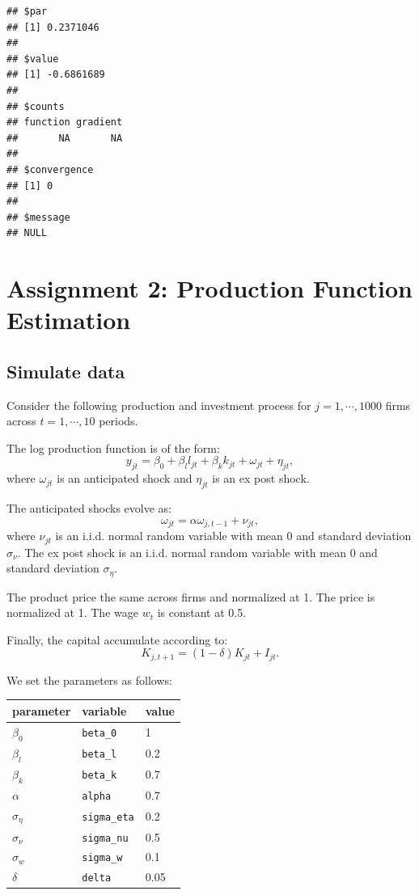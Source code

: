 \documentclass[
]{book}
\begin{document}
\begin{verbatim}
## $par
## [1] 0.2371046
## 
## $value
## [1] -0.6861689
## 
## $counts
## function gradient 
##       NA       NA 
## 
## $convergence
## [1] 0
## 
## $message
## NULL
\end{verbatim}

\hypertarget{assignment2}{%
\chapter{Assignment 2: Production Function Estimation}\label{assignment2}}

\hypertarget{simulate-data-1}{%
\section{Simulate data}\label{simulate-data-1}}

Consider the following production and investment process for \(j = 1, \cdots, 1000\) firms across \(t = 1, \cdots, 10\) periods.

The log production function is of the form:
\[
y_{jt} = \beta_0 + \beta_l l_{jt} + \beta_k k_{jt} + \omega_{jt} + \eta_{jt},
\]
where \(\omega_{jt}\) is an anticipated shock and \(\eta_{jt}\) is an ex post shock.

The anticipated shocks evolve as:
\[
\omega_{jt} = \alpha \omega_{j, t - 1} + \nu_{jt},
\]
where \(\nu_{jt}\) is an i.i.d. normal random variable with mean 0 and standard deviation \(\sigma_\nu\). The ex post shock is an i.i.d. normal random variable with mean 0 and standard deviation \(\sigma_{\eta}\).

The product price the same across firms and normalized at 1. The price is normalized at 1. The wage \(w_t\) is constant at 0.5.

Finally, the capital accumulate according to:
\[
K_{j, t + 1} = (1 - \delta) K_{jt} + I_{jt}.
\]

We set the parameters as follows:

\begin{longtable}[]{@{}lll@{}}
\toprule()
parameter & variable & value \\
\midrule()
\endhead
\(\beta_0\) & \texttt{beta\_0} & 1 \\
\(\beta_l\) & \texttt{beta\_l} & 0.2 \\
\(\beta_k\) & \texttt{beta\_k} & 0.7 \\
\(\alpha\) & \texttt{alpha} & 0.7 \\
\(\sigma_{\eta}\) & \texttt{sigma\_eta} & 0.2 \\
\(\sigma_{\nu}\) & \texttt{sigma\_nu} & 0.5 \\
\(\sigma_{w}\) & \texttt{sigma\_w} & 0.1 \\
\(\delta\) & \texttt{delta} & 0.05 \\
\bottomrule()
\end{longtable}
\end{document}
